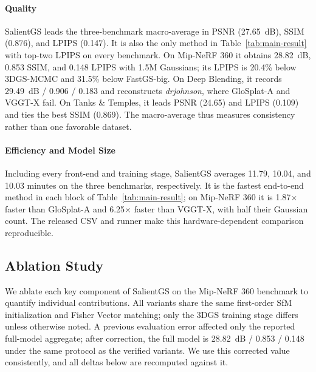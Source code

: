 \documentclass[sigconf]{acmart}
\begin{document}
\paragraph{Quality}
SalientGS leads the three-benchmark macro-average in PSNR (27.65~dB), SSIM (0.876), and LPIPS (0.147). It is also the only method in Table~\ref{tab:main-result} with top-two LPIPS on every benchmark. On Mip-NeRF 360 it obtains 28.82~dB, 0.853 SSIM, and 0.148 LPIPS with 1.5M Gaussians; its LPIPS is 20.4\% below 3DGS-MCMC and 31.5\% below FastGS-big. On Deep Blending, it records 29.49~dB / 0.906 / 0.183 and reconstructs \textit{drjohnson}, where GloSplat-A and VGGT-X fail. On Tanks \& Temples, it leads PSNR (24.65) and LPIPS (0.109) and ties the best SSIM (0.869). The macro-average thus measures consistency rather than one favorable dataset.

\paragraph{Efficiency and Model Size}
Including every front-end and training stage, SalientGS averages 11.79, 10.04, and 10.03 minutes on the three benchmarks, respectively. It is the fastest end-to-end method in each block of Table~\ref{tab:main-result}; on Mip-NeRF 360 it is 1.87$\times$ faster than GloSplat-A and 6.25$\times$ faster than VGGT-X, with half their Gaussian count. The released CSV and runner make this hardware-dependent comparison reproducible.


\subsection{Ablation Study}
\label{sec:ablation}

We ablate each key component of SalientGS on the Mip-NeRF 360 benchmark to quantify individual contributions. All variants share the same first-order SfM initialization and Fisher Vector matching; only the 3DGS training stage differs unless otherwise noted. A previous evaluation error affected only the reported full-model aggregate; after correction, the full model is 28.82~dB / 0.853 / 0.148 under the same protocol as the verified variants. We use this corrected value consistently, and all deltas below are recomputed against it.
\end{document}
